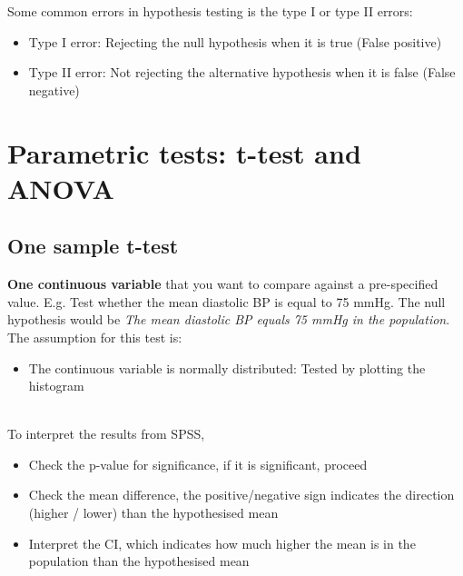 \documentclass{article}
\begin{document}
Some common errors in hypothesis testing is the type I or type II errors:
\begin{itemize}
    \item Type I error: Rejecting the null hypothesis when it is true (False positive)
    \item Type II error: Not rejecting the alternative hypothesis when it is false (False negative)
\end{itemize}

\pagebreak
\section{Parametric tests: t-test and ANOVA}
\subsection{One sample t-test}
\textbf{One continuous variable} that you want to compare against a pre-specified value. E.g. Test whether the mean diastolic BP is equal to 75 mmHg. The null hypothesis would be \textit{The mean diastolic BP equals 75 mmHg in the population}. The assumption for this test is:
\begin{itemize}
    \item The continuous variable is normally distributed: Tested by plotting the histogram
\end{itemize}
\mbox{}\\
To interpret the results from SPSS, 
\begin{itemize}
    \item Check the p-value for significance, if it is significant, proceed
    \item Check the mean difference, the positive/negative sign indicates the direction (higher / lower) than the hypothesised mean
    \item Interpret the CI, which indicates how much higher the mean is in the population than the hypothesised mean
\end{itemize}
\end{document}
